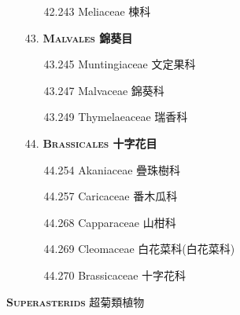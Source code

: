 \begin{enumerate}
\begin{enumerate}
      \item[42.243] Meliaceae 楝科  
        
    \end{enumerate}
  \item[43. ] \textbf{\textsc{Malvales} 錦葵目} 
    \begin{enumerate}
      \item[43.245] Muntingiaceae 文定果科  
        
      \item[43.247] Malvaceae 錦葵科  
        
      \item[43.249] Thymelaeaceae 瑞香科  
        
    \end{enumerate}
  \item[44. ] \textbf{\textsc{Brassicales} 十字花目} 
    \begin{enumerate}
      \item[44.254] Akaniaceae 疊珠樹科  
        
      \item[44.257] Caricaceae 番木瓜科  
        
      \item[44.268] Capparaceae 山柑科  
        
      \item[44.269] Cleomaceae 白花菜科(白花菜科)  
        
      \item[44.270] Brassicaceae 十字花科  
        
    \end{enumerate}
\end{enumerate}
\vspace{2ex} 
\noindent \normalsize\textsc{\textbf{Superasterids} 超菊類植物}\selectfont \\
\footnotesize\selectfont
